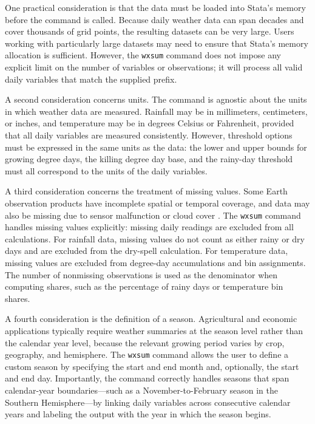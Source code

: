 One practical consideration is that the data must be loaded into Stata's memory before the command is called. Because daily weather data can span decades and cover thousands of grid points, the resulting datasets can be very large. Users working with particularly large datasets may need to ensure that Stata's memory allocation is sufficient. However, the \texttt{wxsum} command does not impose any explicit limit on the number of variables or observations; it will process all valid daily variables that match the supplied prefix.

A second consideration concerns units. The command is agnostic about the units in which weather data are measured. Rainfall may be in millimeters, centimeters, or inches, and temperature may be in degrees Celsius or Fahrenheit, provided that all daily variables are measured consistently. However, threshold options must be expressed in the same units as the data: the lower and upper bounds for growing degree days, the killing degree day base, and the rainy-day threshold must all correspond to the units of the daily variables.

A third consideration concerns the treatment of missing values. Some Earth observation products have incomplete spatial or temporal coverage, and data may also be missing due to sensor malfunction or cloud cover \citep{Dinku2020}. The \texttt{wxsum} command handles missing values explicitly: missing daily readings are excluded from all calculations. For rainfall data, missing values do not count as either rainy or dry days and are excluded from the dry-spell calculation. For temperature data, missing values are excluded from degree-day accumulations and bin assignments. The number of nonmissing observations is used as the denominator when computing shares, such as the percentage of rainy days or temperature bin shares.

A fourth consideration is the definition of a season. Agricultural and economic applications typically require weather summaries at the season level rather than the calendar year level, because the relevant growing period varies by crop, geography, and hemisphere. The \texttt{wxsum} command allows the user to define a custom season by specifying the start and end month and, optionally, the start and end day. Importantly, the command correctly handles seasons that span calendar-year boundaries---such as a November-to-February season in the Southern Hemisphere---by linking daily variables across consecutive calendar years and labeling the output with the year in which the season begins.


